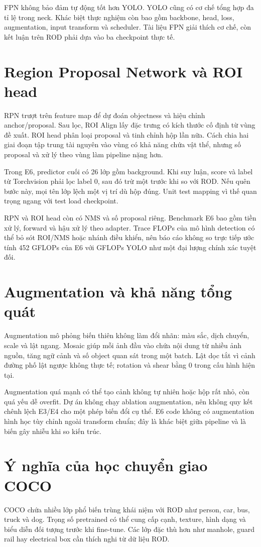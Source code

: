 FPN không bảo đảm tự động tốt hơn YOLO. YOLO cũng có cơ chế tổng hợp đa tỉ lệ trong neck. Khác biệt thực nghiệm còn bao gồm backbone, head, loss, augmentation, input transform và scheduler. Tài liệu FPN giải thích cơ chế, còn kết luận trên ROD phải dựa vào ba checkpoint thực tế.

\section{Region Proposal Network và ROI head}
RPN trượt trên feature map để dự đoán objectness và hiệu chỉnh anchor/proposal. Sau lọc, ROI Align lấy đặc trưng có kích thước cố định từ vùng đề xuất. ROI head phân loại proposal và tinh chỉnh hộp lần nữa. Cách chia hai giai đoạn tập trung tài nguyên vào vùng có khả năng chứa vật thể, nhưng số proposal và xử lý theo vùng làm pipeline nặng hơn.

Trong E6, predictor cuối có 26 lớp gồm background. Khi suy luận, score và label từ Torchvision phải lọc label 0, sau đó trừ một trước khi so với ROD. Nếu quên bước này, mọi tên lớp lệch một vị trí dù hộp đúng. Unit test mapping vì thế quan trọng ngang với test load checkpoint.

RPN và ROI head còn có NMS và số proposal riêng. Benchmark E6 bao gồm tiền xử lý, forward và hậu xử lý theo adapter. Trace FLOPs của mô hình detection có thể bỏ sót ROI/NMS hoặc nhánh điều khiển, nên báo cáo không so trực tiếp ước tính 452 GFLOPs của E6 với GFLOPs YOLO như một đại lượng chính xác tuyệt đối.

\section{Augmentation và khả năng tổng quát}
Augmentation mô phỏng biến thiên không làm đổi nhãn: màu sắc, dịch chuyển, scale và lật ngang. Mosaic giúp mỗi ảnh đầu vào chứa nội dung từ nhiều ảnh nguồn, tăng ngữ cảnh và số object quan sát trong một batch. Lật dọc tắt vì cảnh đường phố lật ngược không thực tế; rotation và shear bằng 0 trong cấu hình hiện tại.

Augmentation quá mạnh có thể tạo cảnh không tự nhiên hoặc hộp rất nhỏ, còn quá yếu dễ overfit. Dự án không chạy ablation augmentation, nên không quy kết chênh lệch E3/E4 cho một phép biến đổi cụ thể. E6 code không có augmentation hình học tùy chỉnh ngoài transform chuẩn; đây là khác biệt giữa pipeline và là biến gây nhiễu khi so kiến trúc.

\section{Ý nghĩa của học chuyển giao COCO}
COCO chứa nhiều lớp phổ biến trùng khái niệm với ROD như person, car, bus, truck và dog. Trọng số pretrained có thể cung cấp cạnh, texture, hình dạng và biểu diễn đối tượng trước khi fine-tune. Các lớp đặc thù hơn như manhole, guard rail hay electrical box cần thích nghi từ dữ liệu ROD.

